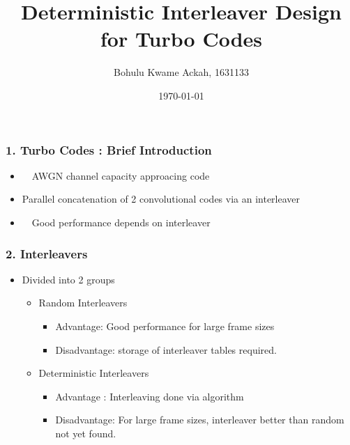 \documentclass{beamer}  %
\title[Deterministic Interleaver Design for Turbo Codes]{Deterministic Interleaver Design for Turbo Codes}
\author[Bohulu]{ Bohulu Kwame Ackah, 1631133 }
\institute[UEC]{Information Transmission Labroratory}
\date[Week 3]{\today}
\begin{document}
\frame{\titlepage}


\begin{frame}

	\frametitle{1. Turbo Codes : Brief Introduction}
	\begin{itemize}
\setlength\itemsep{2em}
	\item　AWGN channel capacity approacing code

\item Parallel concatenation of 2 convolutional codes via an interleaver

	\item　Good performance depends on interleaver
	\end{itemize}
\end{frame}

\begin{frame}
\frametitle{2. Interleavers}


\begin{itemize}
\setlength\itemsep{2em} 

\item Divided into 2 groups
\begin{itemize}
\setlength\itemsep{1em}
\item Random Interleavers
\begin{itemize}
\item Advantage: Good performance for large frame sizes

\item Disadvantage: storage of interleaver tables required.
\end{itemize}
\item Deterministic Interleavers
\begin{itemize}
\item Advantage : Interleaving done via algorithm

\item Disadvantage: For large frame sizes, interleaver better than random not yet found.

\end{itemize}
\end{itemize}

\end{itemize}
\end{frame}
\end{document}

